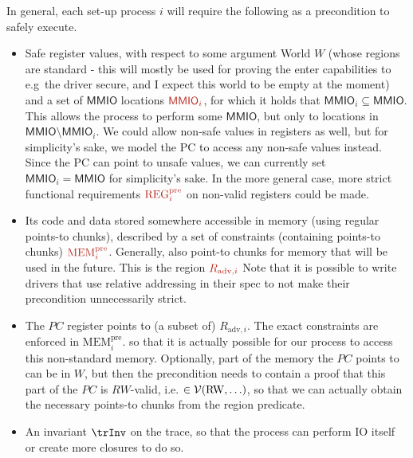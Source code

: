 \documentclass{article}
\newcommand{\X}[1]{\ensuremath{\mathrm{#1}}}
\newcommand{\Sf}[1]{\ensuremath{\mathsf{#1}}}
\newcommand{\br}[1]{{\color{BrickRed} #1}}
\newcommand{\MMIO}{\Sf{MMIO}\xspace}
\begin{document}
In general, each set-up process $i$ will require the following as a precondition to safely execute.
\begin{itemize}
\item Safe register values, with respect to some argument World $W$ (whose regions are standard - this will mostly be used for proving the enter capabilities to e.g\ the driver secure, and I expect this world to be empty at the moment) and a set of \MMIO locations $\br{\MMIO_{i}}$, for which it holds that $\MMIO_i \subseteq \MMIO$. This allows the process to perform some $\MMIO$, but only to locations in $\MMIO \setminus \MMIO_i$. We could allow non-safe values in registers as well, but for simplicity's sake, we model the PC to access any non-safe values instead. Since the PC can point to unsafe values, we can currently set $\MMIO_i = \MMIO$ for simplicity's sake. In the more general case, more strict functional requirements $\br{\X{REG}_i^{\X{pre}}}$ on non-valid registers could be made.
\item Its code and data stored somewhere accessible in memory (using regular points-to chunks), described by a set of constraints (containing points-to chunks) $\br{\X{MEM}_i^{\X{pre}}}$. Generally, also point-to chunks for memory that will be used in the future. This is the region $\br{R_{\X{adv},i}}$ Note that it is possible to write drivers that use relative addressing in their spec to not make their precondition unnecessarily strict.
\item The $PC$ register points to (a subset of)  $R_{\X{adv},i}$.
  The exact constraints are enforced in $\X{MEM}_i^{\X{pre}}$.
  so that it is actually possible for our process to access this non-standard memory.
  Optionally, part of the memory the $PC$ points to can be in $W$, but then the precondition needs to contain a proof that this part of the $PC$ is $RW$-valid, i.e. $\in \VR(\X{RW},\ldots)$, so that we can actually obtain the necessary points-to chunks from the region predicate.

\item An invariant $\trInv$ on the trace, so that the process can perform IO itself or create more closures to do so.
\end{itemize}
\end{document}
